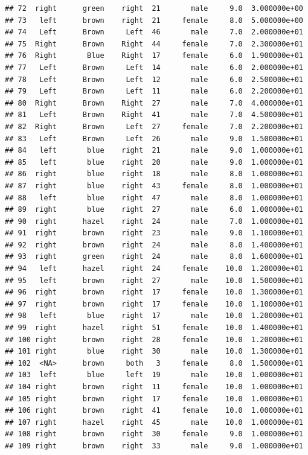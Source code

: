\documentclass[]{article}
\begin{document}
\begin{verbatim}
## 72  right      green    right  21       male     9.0  3.000000e+00
## 73   left      brown    right  21     female     8.0  5.000000e+00
## 74   Left      Brown     Left  46       male     7.0  2.000000e+01
## 75  Right      Brown    Right  44     female     7.0  2.300000e+01
## 76  Right       Blue    Right  17     female     6.0  1.900000e+01
## 77   Left      Brown     Left  14       male     6.0  2.000000e+01
## 78   Left      Brown     Left  12       male     6.0  2.500000e+01
## 79   Left      Brown     Left  11       male     6.0  2.200000e+01
## 80  Right      Brown    Right  27       male     7.0  4.000000e+01
## 81   Left      Brown    Right  41       male     7.0  4.500000e+01
## 82  Right      Brown     Left  27     female     7.0  2.200000e+01
## 83   Left      Brown     Left  26       male     9.0  1.500000e+01
## 84   left       blue    right  21       male     9.0  1.000000e+01
## 85   left       blue    right  20       male     9.0  1.000000e+01
## 86  right       blue    right  18       male     8.0  1.000000e+01
## 87  right       blue    right  43     female     8.0  1.000000e+01
## 88   left       blue    right  47       male     8.0  1.000000e+01
## 89  right       blue    right  27       male     6.0  1.000000e+01
## 90  right      hazel    right  24       male     7.0  1.000000e+01
## 91  right      brown    right  23       male     9.0  1.100000e+01
## 92  right      brown    right  24       male     8.0  1.400000e+01
## 93  right      green    right  24       male     8.0  1.600000e+01
## 94   left      hazel    right  24     female    10.0  1.200000e+01
## 95   left      brown    right  27       male    10.0  1.500000e+01
## 96  right      brown    right  17     female    10.0  1.300000e+01
## 97  right      brown    right  17     female    10.0  1.100000e+01
## 98   left       blue    right  17       male    10.0  1.200000e+01
## 99  right      hazel    right  51     female    10.0  1.400000e+01
## 100 right      brown    right  28     female    10.0  1.200000e+01
## 101 right       blue    right  30       male    10.0  1.300000e+01
## 102  <NA>      brown     both   3     female     8.0  1.500000e+01
## 103  left       blue     left  19       male    10.0  1.000000e+01
## 104 right      brown    right  11     female    10.0  1.000000e+01
## 105 right      brown    right  17     female    10.0  1.000000e+01
## 106 right      brown    right  41     female    10.0  1.000000e+01
## 107 right      hazel    right  45       male    10.0  1.000000e+01
## 108 right      brown    right  30     female     9.0  1.000000e+01
## 109 right      brown    right  33       male     9.0  1.000000e+01

\end{verbatim}
\end{document}
